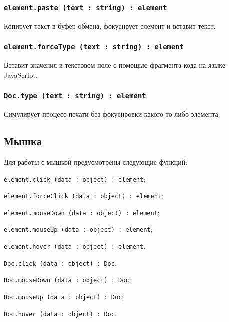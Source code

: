 \subsubsection{\lstinline|element.paste (text : string) : element|}

Копирует текст в буфер обмена, фокусирует элемент и вставит текст.

\subsubsection{\lstinline|element.forceType (text : string) : element|}

Вставит значения в текстовом поле с помощью фрагмента кода на языке JavaScript.

\subsubsection{\lstinline|Doc.type (text : string) : element|}

Симулирует процесс печати без фокусировки какого-то либо элемента.

\subsection{Мышка}
\label{mouse}

Для работы с мышкой предусмотрены следующие функций:
\begin{icItems}
	\item \lstinline|element.click (data : object) : element|;
	\item \lstinline|element.forceClick (data : object) : element|;
	\item \lstinline|element.mouseDown (data : object) : element|;
	\item \lstinline|element.mouseUp (data : object) : element|;
	\item \lstinline|element.hover (data : object) : element|.
	\item \lstinline|Doc.click (data : object) : Doc|.
	\item \lstinline|Doc.mouseDown (data : object) : Doc|;
	\item \lstinline|Doc.mouseUp (data : object) : Doc|;
	\item \lstinline|Doc.hover (data : object) : Doc|.
\end{icItems}

